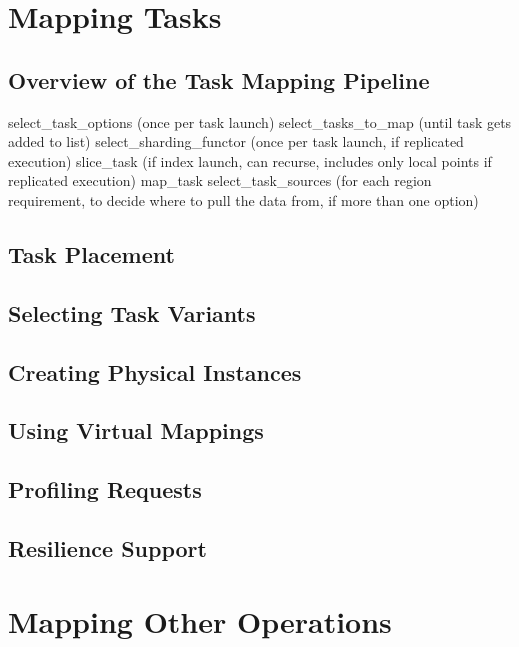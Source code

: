 \section{Mapping Tasks}
\label{sec:mapping:tasks}

\subsection{Overview of the Task Mapping Pipeline}
select\_task\_options (once per task launch)
select\_tasks\_to\_map (until task gets added to list)
select\_sharding\_functor (once per task launch, if replicated execution)
slice\_task (if index launch, can recurse, includes only local points if replicated execution)
map\_task
select\_task\_sources (for each region requirement, to decide where to pull the data from, if more than one option)

\subsection{Task Placement}
\label{subsec:mapping:placement}

\subsection{Selecting Task Variants}
\label{subsec:mapping:variants}

\subsection{Creating Physical Instances}
\label{subsec:mapping:instances}

\subsection{Using Virtual Mappings}
\label{subsec:mapping:virtual}

\subsection{Profiling Requests}
\label{subsec:mapping:profiling}

\subsection{Resilience Support}
\label{subsec:mapping:resilience}



\section{Mapping Other Operations}
\label{sec:mapping:others}

